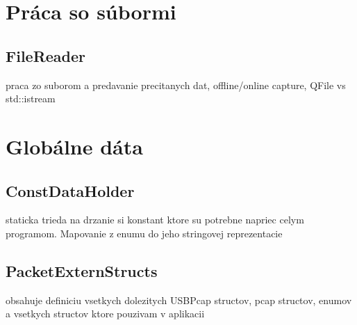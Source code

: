 \section{Práca so súbormi}
\subsection{FileReader}
praca zo suborom a predavanie precitanych dat, offline/online capture, QFile vs std::istream
\section{Globálne dáta}
\subsection{ConstDataHolder}
staticka trieda na drzanie si konstant ktore su potrebne napriec celym programom. Mapovanie z enumu do jeho stringovej reprezentacie
\subsection{PacketExternStructs}
obsahuje definiciu vsetkych dolezitych USBPcap structov, pcap structov, enumov a vsetkych structov ktore pouzivam v aplikacii












